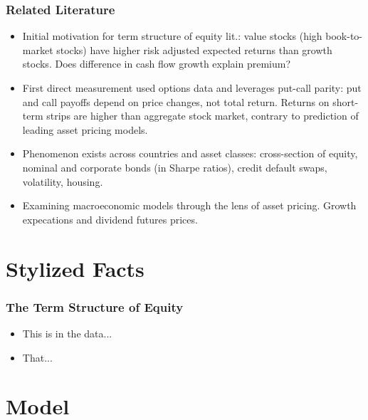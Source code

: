 \begin{frame}
  \frametitle{Related Literature}
  \begin{itemize}
  \item Initial motivation for term structure of equity lit.: value stocks (high book-to-market stocks) have higher risk adjusted expected returns than growth stocks. Does difference in cash flow growth explain premium?
  \\ 
  \item First direct measurement used options data and leverages put-call parity: put and call payoffs depend on price changes, not total return. Returns on short-term strips are higher than aggregate stock market, contrary to prediction of leading asset pricing models.
  \\ 
  \item Phenomenon exists across countries and asset classes: cross-section of equity, nominal and corporate bonds (in Sharpe ratios), credit default swaps, volatility, housing.
  \\ 
  \item Examining macroeconomic models through the lens of asset pricing. Growth expecations and dividend futures prices. 
  \\ 
  \end{itemize}
\end{frame}

\section{Stylized Facts}


\begin{frame}
  \frametitle{The Term Structure of Equity}
  \begin{itemize}
  \item This is in the data...
  \item That...
  \end{itemize}
\label{slide:stylized_facts}
\end{frame}

\section{Model}


